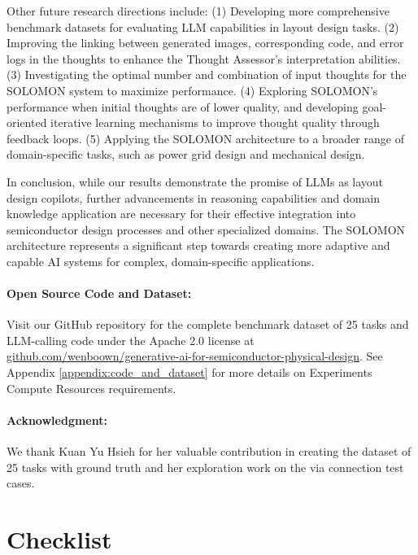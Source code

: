 \documentclass{article}
\begin{document}
Other future research directions include:
(1) Developing more comprehensive benchmark datasets for evaluating LLM capabilities in layout design tasks.
(2) Improving the linking between generated images, corresponding code, and error logs in the thoughts to enhance the Thought Assessor's interpretation abilities.
(3) Investigating the optimal number and combination of input thoughts for the SOLOMON system to maximize performance.
(4) Exploring SOLOMON's performance when initial thoughts are of lower quality, and developing goal-oriented iterative learning mechanisms to improve thought quality through feedback loops.
(5) Applying the SOLOMON architecture to a broader range of domain-specific tasks, such as power grid design and mechanical design.

In conclusion, while our results demonstrate the promise of LLMs as layout design copilots, further advancements in reasoning capabilities and domain knowledge application are necessary for their effective integration into semiconductor design processes and other specialized domains. The SOLOMON architecture represents a significant step towards creating more adaptive and capable AI systems for complex, domain-specific applications.

\paragraph{Open Source Code and Dataset:} Visit our GitHub repository for the complete benchmark dataset of 25 tasks and LLM-calling code under the Apache 2.0 license at \url{github.com/wenboown/generative-ai-for-semiconductor-physical-design}. See Appendix \ref{appendix:code_and_dataset} for more details on Experiments Compute Resources requirements.

\paragraph{Acknowledgment:} We thank Kuan Yu Hsieh for her valuable contribution in creating the dataset of 25 tasks with ground truth and her exploration work on the via connection test cases.




\newpage
\section*{Checklist}
\end{document}
